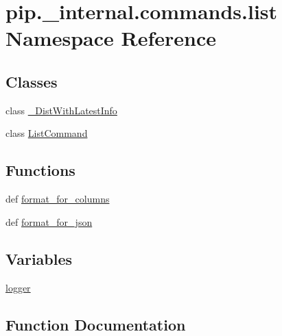 \hypertarget{namespacepip_1_1__internal_1_1commands_1_1list}{}\section{pip.\+\_\+internal.\+commands.\+list Namespace Reference}
\label{namespacepip_1_1__internal_1_1commands_1_1list}
\subsection*{Classes}
\begin{DoxyCompactItemize}
\item 
class \hyperlink{classpip_1_1__internal_1_1commands_1_1list_1_1__DistWithLatestInfo}{\+\_\+\+Dist\+With\+Latest\+Info}
\item 
class \hyperlink{classpip_1_1__internal_1_1commands_1_1list_1_1ListCommand}{List\+Command}
\end{DoxyCompactItemize}
\subsection*{Functions}
\begin{DoxyCompactItemize}
\item 
def \hyperlink{namespacepip_1_1__internal_1_1commands_1_1list_a071d9c83f7996573b82b9142a03e2110}{format\+\_\+for\+\_\+columns}
\item 
def \hyperlink{namespacepip_1_1__internal_1_1commands_1_1list_a06ff040e3149332d86d86ba598f57c28}{format\+\_\+for\+\_\+json}
\end{DoxyCompactItemize}
\subsection*{Variables}
\begin{DoxyCompactItemize}
\item 
\hyperlink{namespacepip_1_1__internal_1_1commands_1_1list_a4ae57185c4eec789a202856dfdeaf654}{logger}
\end{DoxyCompactItemize}


\subsection{Function Documentation}
\mbox{\label{namespacepip_1_1__internal_1_1commands_1_1list_a071d9c83f7996573b82b9142a03e2110}} 
